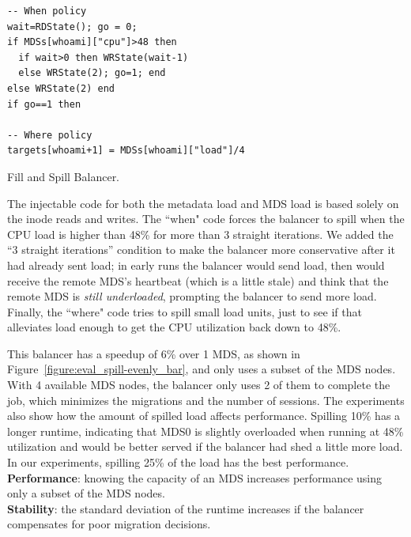 \begin{listing}
	\ssp
	\begin{verbatim}
-- When policy
wait=RDState(); go = 0;
if MDSs[whoami]["cpu"]>48 then
  if wait>0 then WRState(wait-1)
  else WRState(2); go=1; end
else WRState(2) end
if go==1 then

-- Where policy
targets[whoami+1] = MDSs[whoami]["load"]/4
	\end{verbatim}
	\dsp
    \caption{Fill and Spill Balancer.\label{listing:fill-and-spill}}
\end{listing}
The injectable code for both the metadata load and MDS load is based solely on the inode reads and writes. The ``when" code forces the balancer to spill when the CPU load is higher than 48\% for more than 3 straight iterations. We added the ``3 straight iterations'' condition to make the balancer more conservative after it had already sent load; in early runs the balancer would send load, then would receive the remote MDS's heartbeat (which is a little stale) and think that the remote MDS is {\it still underloaded}, prompting the balancer to send more load. Finally, the ``where" code tries to spill small load units, just to see if that alleviates load enough to get the CPU utilization back down to 48\%. 

This balancer has a speedup of 6\% over 1 MDS, as shown in Figure~\ref{figure:eval_spill-evenly_bar}, and only uses a subset of the MDS nodes. With 4 available MDS nodes, the balancer only uses 2 of them to complete the job, which minimizes the migrations and the number of sessions. The experiments also show how the amount of spilled load affects performance. Spilling 10\% has a longer runtime, indicating that MDS0 is slightly overloaded when running at 48\% utilization and would be better served if the balancer had shed a little more load. In our experiments, spilling 25\% of the load has the best performance.\\

\noindent\textbf{Performance}: knowing the capacity of an MDS increases performance using only a subset of the MDS nodes.\\
\noindent\textbf{Stability}: the standard deviation of the runtime increases if the balancer compensates for poor migration decisions.

